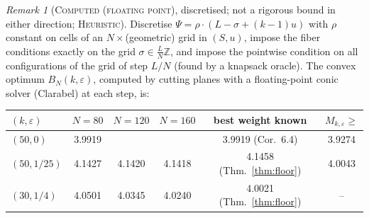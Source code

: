\documentclass[11pt]{amsart}
\theoremstyle{definition}
\theoremstyle{remark}
\newtheorem{remark}[theorem]{Remark}
\newcommand{\lbl}[1]{\textup{\textsc{#1}}}
\begin{document}
\begin{remark}[\lbl{Computed (floating point)}, discretised; not a rigorous bound in either direction; \lbl{Heuristic}]\label{prop:family}
Discretise $\Psi=\rho\cdot(L-\sigma+(k-1)u)$ with $\rho$ constant on cells of
an $N\times{}$(geometric) grid in $(S,u)$, impose the fiber conditions exactly
on the grid $\sigma\in\frac LN\mathbb Z$, and impose the pointwise condition
on all configurations of the grid of step $L/N$ (found by a knapsack oracle).
The convex optimum $B_N(k,\varepsilon)$, computed by cutting planes with a
floating-point conic solver (Clarabel) at each step, is:
\begin{center}
\begin{tabular}{@{}lccccc@{}}
\toprule
$(k,\varepsilon)$ & $N=80$ & $N=120$ & $N=160$ & best weight known & $M_{k,\varepsilon}\ge$\\
\midrule
$(50,0)$    & 3.9919 & & & 3.9919 (Cor.~6.4) & 3.9274\\
$(50,1/25)$ & 4.1427 & 4.1420 & 4.1418 & 4.1458 (Thm.~\ref{thm:floor}) & 4.0043\\
$(30,1/4)$  & 4.0501 & 4.0345 & 4.0240 & 4.0021 (Thm.~\ref{thm:floor}) & --\\
\bottomrule
\end{tabular}
\end{center}
\end{remark}
\end{document}
